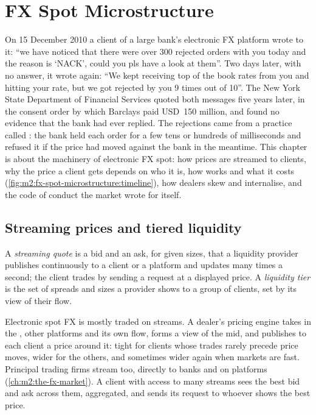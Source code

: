 \chapter{FX Spot Microstructure}\label{ch:m2:fx-spot-microstructure}

On 15 December 2010 a client of a large bank's electronic FX platform wrote
to it: ``we have noticed that there were over 300 rejected orders with you
today and the reason is `NACK', could you pls have a look at them''. Two days
later, with no answer, it wrote again: ``We kept receiving top of the book
rates from you and hitting your rate, but we got rejected by you 9 times out of
10''. The New York State Department of Financial Services quoted both messages
five years later, in the consent order by which Barclays paid USD~150 million,
and found no evidence that the bank had ever replied. The rejections came from
a practice called : the bank held each order for a few tens or
hundreds of milliseconds and refused it if the price had moved against the
bank in the meantime. This chapter is about the machinery of electronic FX
spot: how prices are streamed to clients, why the price a client gets depends
on who it is, how  works and what it costs
(\cref{fig:m2:fx-spot-microstructure:timeline}), how dealers skew and
internalise, and the code of conduct the market wrote for itself.

\section{Streaming prices and tiered liquidity}

\begin{definition}\label{def:m2:fx-spot-microstructure:stream}
A \emph{streaming quote} is a bid and an ask, for given
sizes, that a liquidity provider publishes continuously to a client or a
platform and updates many times a second; the client trades by sending a
request at a displayed price. A \emph{liquidity tier} is
the set of spreads and sizes a provider shows to a group of clients, set by its
view of their flow.
\end{definition}

Electronic spot FX is mostly traded on streams. A dealer's pricing engine takes
in the , other platforms and its own flow, forms a view of the
mid, and publishes to each client a price around it: tight for clients whose
trades rarely precede price moves, wider for the others, and sometimes wider
again when markets are fast. Principal trading firms stream too, directly to
banks and on platforms (\cref{ch:m2:the-fx-market}). A client with access to
many streams sees the best bid and ask across them, aggregated, and sends its
request to whoever shows the best price.

